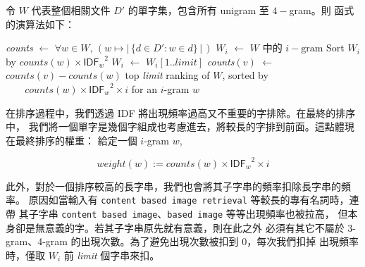 令 $W$ 代表整個相關文件 $D'$ 的單字集，包含所有 unigram 至 $4-$gram。則
 函式的演算法如下：

\begin{algorithmic}
    \State \textit{counts} $\gets$ $\forall w\in W,\,\left(w\mapsto|\,\{d\in D':w\in d\}\,|\,\right)$
      \State $W_i$ $\gets$ $W$ 中的 $i-\text{gram}$
      \State Sort $W_i$ by $\mathit{counts}(w)\times {\mathsf{IDF}_w}^2$
      \State $W_i$ $\gets$ $W_i[1..\mathit{limit}]$
          \State \textit{counts}$(v)$ $\gets$ $\mathit{counts}(v)-\mathit{counts}(w)$
        \EndFor
      \EndFor
    \EndFor
    \State\Return top \textit{limit} ranking of $W$, sorted by
    \State   $\;\;\;\;\;\;\;\mathit{counts}(w)\times{\mathsf{IDF}_w}^2\times i$ for an $i$-gram $w$
  \EndFunction
\end{algorithmic}

在排序過程中，我們透過 \textsf{IDF} 將出現頻率過高又不重要的字排除。在最終的排序中，
我們將一個單字是幾個字組成也考慮進去，將較長的字排到前面。這點體現在最終排序的權重：
給定一個 $i$-gram $w$,

\[ \mathit{weight}(w) := \mathit{counts}(w)\times{\mathsf{IDF}_w}^2\times i \]

此外，對於一個排序較高的長字串，我們也會將其子字串的頻率扣除長字串的頻率。
原因如當輸入有 \texttt{content based image retrieval} 等較長的專有名詞時，連帶
其子字串 \texttt{content based image}、\texttt{based image} 等等出現頻率也被拉高，
但本身卻是無意義的字。若其子字串原先就有意義，則在此之外
必須有其它不屬於 3-gram、4-gram 的出現次數。為了避免出現次數被扣到 0，每次我們扣掉
出現頻率時，僅取 $W_i$ 前 \textit{limit} 個字串來扣。
